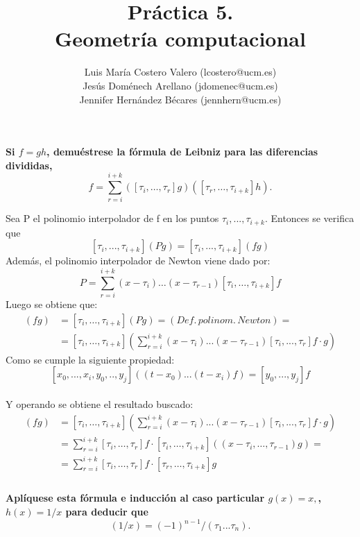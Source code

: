 \documentclass[12pt,a4paper]{article}
\title{Práctica 5. \\ Geometría computacional}
\author{Luis María Costero Valero (lcostero@ucm.es)\\ Jesús Doménech
  Arellano (jdomenec@ucm.es) \\ Jennifer Hernández Bécares (jennhern@ucm.es)}
\date{}
\begin{document}
\maketitle
\onehalfspace

\textbf{Si $f=gh$, demuéstrese la fórmula de Leibniz para las diferencias divididas,}
\begin{equation*}
  [\tau_i,\dots,\tau_{i+k}]f=\sum\limits_{r=i}^{i+k}([\tau_i,\dots,\tau_r]g)([\tau_r,\dots,\tau_{i+k}]h).
\end{equation*}

Sea P el polinomio interpolador de f en los puntos $\tau_i, ... ,
\tau_{i+k}$. Entonces se verifica que $$[\tau_{i}, ..., \tau_{i+k}](Pg) =
[\tau_i, ..., \tau_{i+k}](fg)$$
Además, el polinomio interpolador de Newton viene dado por:
$$ P = \sum\limits^{i+k}_{r=i}(x-\tau_i)\dots(x-\tau_{r-1})[\tau_i,\dots,\tau_{i+k}]f$$
Luego se obtiene que:
\begin{align*}
  [\tau_i,\dots,\tau_{i+k}](fg) &= [\tau_i,\dots,\tau_{i+k}](Pg) = (Def.\,polinom.\,Newton)=\\
                      &= [\tau_i,\dots,\tau_{i+k}]\left(\sum\limits_{r=i}^{i+k}(x-\tau_i)...(x-\tau_{r-1})[\tau_i,...,\tau_r]f
                        \cdot g\right)
\end{align*}
Como se cumple la siguiente propiedad:
$$[x_0, ..., x_i, y_0, .., y_j]((t-x_0)...(t-x_i)f) = [y_0,...,y_j]f$$\\
Y operando se obtiene el resultado buscado:
\begin{align*}
  [\tau_i,\dots,\tau_{i+k}](fg) &= [\tau_i,\dots,\tau_{i+k}]\left(\sum\limits_{r=i}^{i+k}(x-\tau_i)...(x-\tau_{r-1})[\tau_i,...,\tau_r]f
                        \cdot g\right)\\
                      &=\sum\limits^{i+k}_{r=i}[\tau_i,\dots,\tau_{r}]f \cdot
                        [\tau_i,\dots,\tau_{i+k}]\left((x-\tau_i,\dots,\tau_{r-1})g\right)=\\
                      &=\sum\limits^{i+k}_{r=i}[\tau_i,\dots,\tau_r]f \cdot [\tau_r,
                        \dots, \tau_{i+k}]g\\
\end{align*}\\

\textbf{Aplíquese esta fórmula e inducción al caso particular $g(x)=x,$, $h(x)=1/x$ para deducir que}
\begin{equation*}
  [\tau_1,...,\tau_n](1/x)=(-1)^{n-1}/(\tau_1...\tau_n).
\end{equation*}
\end{document}
